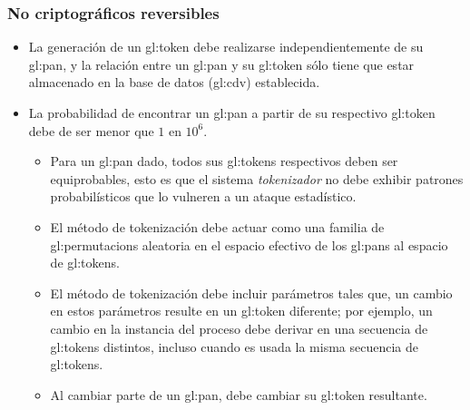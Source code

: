 %
%

\subsubsection{No criptográficos reversibles}

\begin{itemize}

  \item La generación de un \gls{gl:token} debe realizarse independientemente 
  de su \gls{gl:pan}, y la relación entre un \gls{gl:pan} y su \gls{gl:token} 
  sólo tiene que estar almacenado en la base de datos (\acrlong{gl:cdv}) 
  establecida.

  \item La probabilidad de encontrar un \gls{gl:pan} a partir de su respectivo 
  \gls{gl:token} debe de ser menor que $1$ en $10^6$.

    \begin{itemize}
      
      \item Para un \gls{gl:pan} dado, todos sus \glspl{gl:token} respectivos 
      deben ser equiprobables, esto es que el sistema \textit{tokenizador} no 
      debe exhibir patrones probabilísticos que lo vulneren a un ataque 
      estadístico.

      \item El método de tokenización debe actuar como una familia de 
      \glspl{gl:permutacion} aleatoria en el espacio efectivo de los 
      \glspl{gl:pan} al espacio de \glspl{gl:token}.

      \item El método de tokenización debe incluir parámetros tales que, un 
      cambio en estos parámetros resulte en un \gls{gl:token} diferente; por 
      ejemplo, un cambio en la instancia del proceso debe derivar en una 
      secuencia de \glspl{gl:token} distintos, incluso cuando es usada la 
      misma secuencia de \glspl{gl:token}.

      \item Al cambiar parte de un \gls{gl:pan}, debe cambiar su \gls{gl:token} 
      resultante.


\end{itemize}
\end{itemize}
